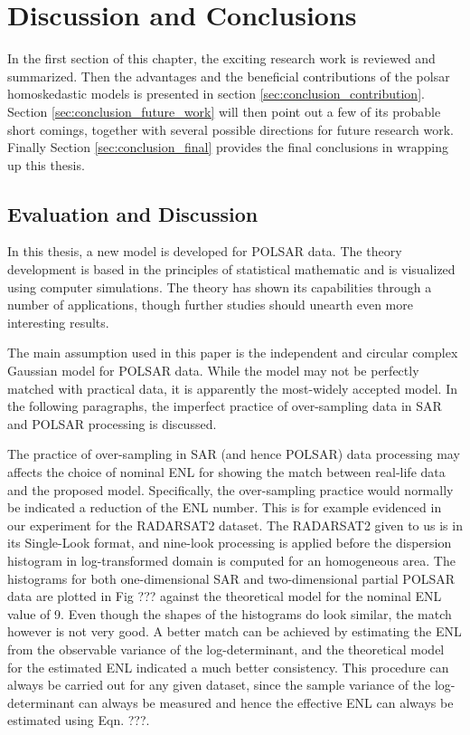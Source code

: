 \chapter{Discussion and Conclusions} %
\label{chap:conclusions}


In the first section of this chapter,
  the exciting research work is reviewed and summarized.
Then the advantages and the beneficial contributions of the polsar homoskedastic models is presented in section \ref{sec:conclusion_contribution}.
Section \ref{sec:conclusion_future_work} will then point out a few of its probable short comings, together with several possible directions for future research work.
Finally Section \ref{sec:conclusion_final} provides the final conclusions in wrapping up this thesis.


\section{Evaluation and Discussion}
\label{sec:conclusion_discussion}

In this thesis, a new model is developed for POLSAR data.
The theory development is based in the principles of statistical mathematic and is visualized using computer simulations.
The theory has shown its capabilities through a number of applications, though further studies should unearth even more interesting results.

The main assumption used in this paper is the independent and circular complex Gaussian model for POLSAR data.
While the model may not be perfectly matched with practical data,
  it is apparently the most-widely accepted model.
In the following paragraphs, the imperfect practice of over-sampling   data in SAR and POLSAR processing is discussed.

The practice of over-sampling in SAR (and hence POLSAR) data processing may affects the choice of nominal ENL for showing the match between real-life data and the proposed model.
Specifically, the over-sampling practice would normally be indicated a reduction of the ENL number.
This is for example evidenced in our experiment for the RADARSAT2 dataset.
The RADARSAT2 given to us is in its Single-Look format,
  and nine-look processing is applied before the dispersion histogram in log-transformed domain is computed for an homogeneous area.
The histograms for both one-dimensional SAR and two-dimensional partial POLSAR data are plotted in Fig ???
  against the theoretical model for the nominal ENL value of 9.
Even though the shapes of the histograms do look similar, the match however is not very good.
A better match can be achieved by estimating the ENL from the observable variance of the log-determinant,
  and the theoretical model for the estimated ENL indicated a much better consistency.
This procedure can always be carried out for any given dataset,
  since the sample variance of the log-determinant can always be measured
  and hence the effective ENL can always be estimated using Eqn. ???.

